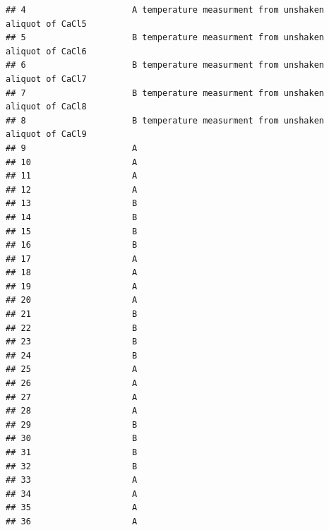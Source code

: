 \documentclass[
]{article}
\begin{document}
\begin{verbatim}
## 4                     A temperature measurment from unshaken aliquot of CaCl5
## 5                     B temperature measurment from unshaken aliquot of CaCl6
## 6                     B temperature measurment from unshaken aliquot of CaCl7
## 7                     B temperature measurment from unshaken aliquot of CaCl8
## 8                     B temperature measurment from unshaken aliquot of CaCl9
## 9                     A                                                      
## 10                    A                                                      
## 11                    A                                                      
## 12                    A                                                      
## 13                    B                                                      
## 14                    B                                                      
## 15                    B                                                      
## 16                    B                                                      
## 17                    A                                                      
## 18                    A                                                      
## 19                    A                                                      
## 20                    A                                                      
## 21                    B                                                      
## 22                    B                                                      
## 23                    B                                                      
## 24                    B                                                      
## 25                    A                                                      
## 26                    A                                                      
## 27                    A                                                      
## 28                    A                                                      
## 29                    B                                                      
## 30                    B                                                      
## 31                    B                                                      
## 32                    B                                                      
## 33                    A                                                      
## 34                    A                                                      
## 35                    A                                                      
## 36                    A                                                      

\end{verbatim}
\end{document}
